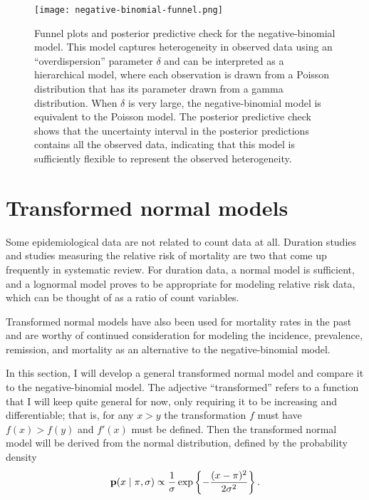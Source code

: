\begin{figure}[h!]
\begin{center}
\texttt{[image: negative-binomial-funnel.png]}
\end{center}
\caption[Funnel plots and posterior predictive check for the
  negative-binomial model.]{Funnel plots and posterior predictive check for the
  negative-binomial model. This model captures heterogeneity in
  observed data using an ``overdispersion'' parameter $\delta$ and
  can be interpreted as a hierarchical model, where each observation
  is drawn from a Poisson distribution that has its parameter drawn
  from a gamma distribution.  When $\delta$ is very large, the
  negative-binomial model is equivalent to the Poisson model.  The
  posterior predictive check shows that the uncertainty interval in the
  posterior predictions contains all the observed data, indicating
  that this model is sufficiently flexible to represent the observed
  heterogeneity.} \label{rate-model-negative-binomial-funnel}
\end{figure}

\section{Transformed normal models}
\label{transformed-normal-models}
Some epidemiological data are not related to count data at all.
Duration studies and studies measuring the relative risk of mortality
are two that come up frequently in systematic review.  For duration
data, a normal model is sufficient, and a lognormal model proves to
be appropriate for modeling relative risk data, which can be thought
of as a ratio of count variables.

Transformed normal models have also been used for mortality rates in
the
past\cite{girosi_demographic_2008,hogan_maternal_2010,rajaratnam_neonatal_2010}
and are worthy of continued consideration for modeling the incidence,
prevalence, remission, and mortality as an alternative to the
negative-binomial model.

In this section, I will develop a general transformed normal model
and compare it to the negative-binomial model.  The adjective
``transformed'' refers to a function that I will keep quite general
for now, only requiring it to be increasing and differentiable;
that is, for any $x > y$ the transformation $f$ must have $f(x) > f(y)$
and $f'(x)$ must be defined.  Then the transformed normal model will
be derived from the normal distribution, defined by the probability
density
\[
\mathbf{p}(x\;|\; \pi, \sigma)
 \propto \frac{1}{\sigma}
\exp\left\{ -\frac{(x-\pi)^2}{2\sigma^2} \right\}.
\]

